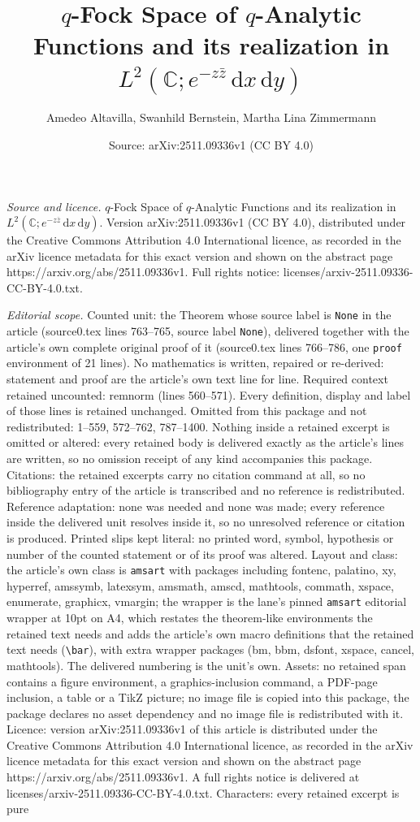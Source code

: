 \documentclass[10pt,a4paper]{amsart}
\title[$q$-Fock Space of $q$-Analytic Functions and its realization]{$q$-Fock Space of $q$-Analytic Functions and its realization in $L^{2}(\mathbb{C}; e^{-z\bar z} \,\mathrm{d}x\,\mathrm{d}y)$}
\author{Amedeo Altavilla, Swanhild Bernstein, Martha Lina Zimmermann}
\date{Source: arXiv:2511.09336v1 (CC BY 4.0)}
\renewcommand{\bar}[1]{\overline{#1}}
\begin{document}
\maketitle

\noindent\emph{Source and licence.} $q$-Fock Space of $q$-Analytic Functions and its realization in $L^{2}(\mathbb{C}; e^{-z\bar z} \,\mathrm{d}x\,\mathrm{d}y)$. Version arXiv:2511.09336v1 (CC BY 4.0), distributed under the Creative Commons Attribution 4.0 International licence, as recorded in the arXiv licence metadata for this exact version and shown on the abstract page https://arxiv.org/abs/2511.09336v1. Full rights notice: licenses/arxiv-2511.09336-CC-BY-4.0.txt.\par\smallskip

\noindent\textit{Editorial scope.} Counted unit: the Theorem whose source label is \texttt{None} in the article (source0.tex lines 763--765, source label \texttt{None}), delivered together with the article's own complete original proof of it (source0.tex lines 766--786, one \texttt{proof} environment of 21 lines). No mathematics is written, repaired or re-derived: statement and proof are the article's own text line for line. Required context retained uncounted: remnorm (lines 560--571). Every definition, display and label of those lines is retained unchanged. Omitted from this package and not redistributed: 1--559, 572--762, 787--1400. Nothing inside a retained excerpt is omitted or altered: every retained body is delivered exactly as the article's lines are written, so no omission receipt of any kind accompanies this package. Citations: the retained excerpts carry no citation command at all, so no bibliography entry of the article is transcribed and no reference is redistributed. Reference adaptation: none was needed and none was made; every reference inside the delivered unit resolves inside it, so no unresolved reference or citation is produced. Printed slips kept literal: no printed word, symbol, hypothesis or number of the counted statement or of its proof was altered. Layout and class: the article's own class is \texttt{amsart} with packages including fontenc, palatino, xy, hyperref, amssymb, latexsym, amsmath, amscd, mathtools, commath, xspace, enumerate, graphicx, vmargin; the wrapper is the lane's pinned \texttt{amsart} editorial wrapper at 10pt on A4, which restates the theorem-like environments the retained text needs and adds the article's own macro definitions that the retained text needs (\texttt{\textbackslash bar}), with extra wrapper packages (bm, bbm, dsfont, xspace, cancel, mathtools). The delivered numbering is the unit's own. Assets: no retained span contains a figure environment, a graphics-inclusion command, a PDF-page inclusion, a table or a TikZ picture; no image file is copied into this package, the package declares no asset dependency and no image file is redistributed with it. Licence: version arXiv:2511.09336v1 of this article is distributed under the Creative Commons Attribution 4.0 International licence, as recorded in the arXiv licence metadata for this exact version and shown on the abstract page https://arxiv.org/abs/2511.09336v1. A full rights notice is delivered at licenses/arxiv-2511.09336-CC-BY-4.0.txt. Characters: every retained excerpt is pure 
\end{document}

